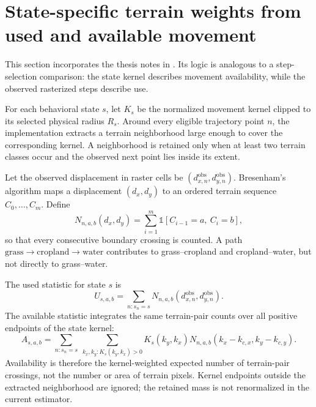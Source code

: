 \section{State-specific terrain weights from used and available movement}
\label{sec:ssf-terrain-weights}

This section incorporates the thesis notes in . Its logic is analogous to a step-selection comparison: the state kernel describes movement availability, while the observed rasterized steps describe use.

For each behavioral state $s$, let $K_s$ be the normalized movement kernel clipped to its selected physical radius $R_s$. Around every eligible trajectory point $n$, the implementation extracts a terrain neighborhood large enough to cover the corresponding kernel. A neighborhood is retained only when at least two terrain classes occur and the observed next point lies inside its extent.

Let the observed displacement in raster cells be $(d^{\mathrm{obs}}_{x,n},d^{\mathrm{obs}}_{y,n})$. Bresenham's algorithm maps a displacement $(d_x,d_y)$ to an ordered terrain sequence $C_0,\ldots,C_m$. Define
\begin{equation}
  N_{n,a,b}(d_x,d_y)
  =\sum_{i=1}^{m}\mathbb{1}[C_{i-1}=a,\ C_i=b],
\end{equation}
so that every consecutive boundary crossing is counted. A path $\text{grass}\rightarrow\text{cropland}\rightarrow\text{water}$ contributes to grass--cropland and cropland--water, but not directly to grass--water.

The used statistic for state $s$ is
\begin{equation}
  U_{s,a,b}=\sum_{n:s_n=s}
    N_{n,a,b}(d^{\mathrm{obs}}_{x,n},d^{\mathrm{obs}}_{y,n}).
\end{equation}
The available statistic integrates the same terrain-pair counts over all positive endpoints of the state kernel:
\begin{equation}
  A_{s,a,b}=\sum_{n:s_n=s}\ \sum_{k_x,k_y:K_s(k_y,k_x)>0}
    K_s(k_y,k_x)
    N_{n,a,b}(k_x-k_{c,x},k_y-k_{c,y}).
\end{equation}
Availability is therefore the kernel-weighted expected number of terrain-pair crossings, not the number or area of terrain pixels. Kernel endpoints outside the extracted neighborhood are ignored; the retained mass is not renormalized in the current estimator.

